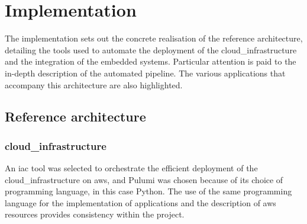 

\chapter{Implementation}
\label{chap:implementation}

The implementation sets out the concrete realisation of the reference architecture, detailing the tools used to automate the deployment of the \gls{cloud_infrastructure} and the integration of the embedded systems. Particular attention is paid to the in-depth description of the automated pipeline. The various applications that accompany this architecture are also highlighted.

\minitoc
\newpage

\section{Reference architecture}

\subsection{\Gls{cloud_infrastructure}}
An \acrfull{iac} tool was selected to orchestrate the efficient deployment of the \gls{cloud_infrastructure} on \gls{aws}, and Pulumi was chosen because of its choice of programming language, in this case Python. The use of the same programming language for the implementation of applications and the description of \gls{aws} resources provides consistency within the project.

